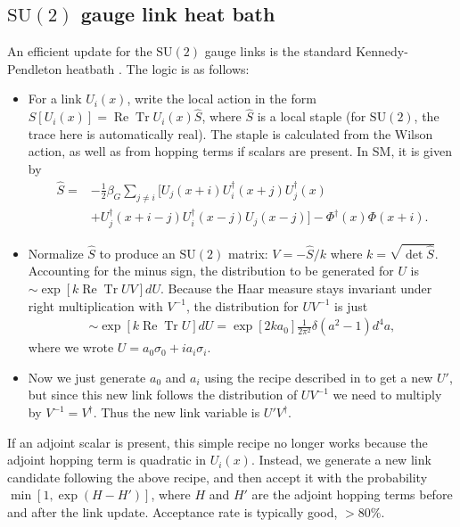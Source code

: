 \documentclass[11pt,a4paper]{article}
\newcommand\RE{\operatorname{Re}}
\newcommand\Tr{\operatorname{Tr}}
\newcommand\he[1]{#1^\dagger}%
\newcommand\gr[1]{\mathrm{#1}}%
\begin{document}
\subsection{$\gr{SU(2)}$ gauge link heat bath}

An efficient update for the $\gr{SU(2)}$ gauge links is the standard Kennedy-Pendleton heatbath \cite{Kennedy:1985nu}. The logic is as follows:
\begin{itemize}

	\item For a link $U_i(x)$, write the local action in the form $S[U_i(x)] = \RE \Tr U_i(x) \hat{S}$, where $\hat{S}$ is a local staple (for $\gr{SU(2)}$, the trace here is automatically real). The staple is calculated from the Wilson action, as well as from hopping terms if scalars are present. In SM, it is given by
\begin{align}
\hat{S} =& - \frac12 \beta_G \sum_{j \neq i} \Big[ U_j(x+i) U^\dagger_i(x+j) U^\dagger_j(x) \nonumber \\ 
 &+ U^\dagger_j(x+i-j) U^\dagger_i(x-j) U_j(x-j) \Big] - \he\Phi(x)\Phi(x+i). 
\end{align} 

	\item Normalize $\hat{S}$ to produce an $\gr{SU(2)}$ matrix: $V = -\hat{S} /k$ where $k = \sqrt{\det \hat{S}}$. Accounting for the minus sign, the distribution to be generated for $U$ is $\sim \exp[k \RE\Tr U V] dU$. Because the Haar measure stays invariant under right multiplication with $V^{-1}$, the distribution for $U V^{-1}$ is just 
\begin{align}
\sim \exp[k \RE\Tr U] dU = \exp[2 k a_0] \frac{1}{2\pi^2} \delta(a^2-1) d^4 a,
\end{align}
where we wrote $U = a_0 \sigma_0 + i a_i \sigma_i$.

	\item Now we just generate $a_0$ and $a_i$ using the recipe described in \cite{Kennedy:1985nu} to get a new $U'$, but since this new link follows the distribution of $U V^{-1}$ we need to multiply by $V^{-1} = \he V$. Thus the new link variable is $U' \he V$.

\end{itemize}


If an adjoint scalar is present, this simple recipe no longer works because the adjoint hopping term is quadratic in $U_i(x)$. Instead, we generate a new link candidate following the above recipe, and then accept it with the probability $\min[1, \exp(H - H')]$, where $H$ and $H'$ are the adjoint hopping terms before and after the link update. Acceptance rate is typically good, $>80\%$.
\end{document}
